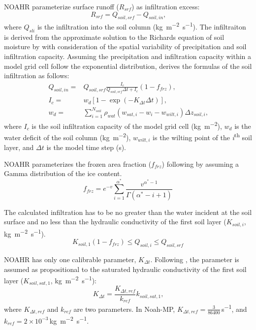 \documentclass[essd]{copernicus}
\begin{document}
NOAHR parameterize surface runoff (\(R_{srf}\)) as infiltration excess:
\begin{equation}
  R_{srf} = Q_{soil,srf} - Q_{soil,in} \text{,}
\end{equation}
where \(Q_{sli}\) is the infiltration into the soil column
(\si{kg~m^{-2}~s^{-1}}). The infiltraiton is derived from the approximate
solution to the Richards equation of soil moisture by \citet{philip1969AiH} with
consideration of the spatial variability of precipitation and soil infiltration
capacity. Assuming the precipitation and infiltration capacity within a model
grid cell follow the exponential distribution, \citet{schaake1996JGRA} derives
the formulas of the soil infiltration as follows:
\begin{align}
  Q_{soil,in} = & Q_{soil,srf} \frac{I_c}{Q_{soil,srf} \Delta t + I_c} (1-f_{frz}) \text{,} \\
  I_{c} =       & w_d [1-\exp(-K_{\Delta t} \Delta t)] \text{,} \\
  w_d =         & \sum_{i=1}^{N_{soil}} \rho_{wat} (w_{sat,i} - w_i - w_{wilt,i}) \Delta z_{soil,i}
  \text{,}
\end{align}
where \(I_{c}\) is the soil infiltration capacity of the model grid cell
(\si{kg~m^{-2}}), \(w_d\) is the water deficit of the soil column
(\si{kg~m^{-2}}), \(w_{wilt,i}\) is the wilting point of the
\textit{i}\textsuperscript{th} soil layer, and \(\Delta t\) is the model time
step (\si{s}).

NOAHR parameterizes the frozen area fraction (\(f_{frz}\)) following
\citet{koren1999JGRA} by assuming a Gamma distribution of the ice content.
\begin{equation}
  f_{frz} = e^{-v} \sum_{i=1}^{\alpha^*} \frac{v^{\alpha^*-1}}{\Gamma(\alpha^*-i+1)}
\end{equation}

The calculated infiltration has to be no greater than the water
incident at the soil surface and no less than the hydraulic conductivity of the
first soil layer (\(K_{soil,i}\), \si{kg~m^{-2}~s^{-1}}).
\begin{equation}
  K_{soil,1} (1-f_{frz}) \leq Q_{soil,i} \leq Q_{soil,srf}
\end{equation}

NOAHR has only one calibrable parameter, \(K_{\Delta t}\). Following
\citet{chen2001MWR}, the parameter is assumed as propositional to the saturated
hydraulic conductivity of the first soil layer (\(K_{soil,sat,1}\),
\si{kg~m^{-2}~s^{-1}}):
\begin{equation}
  K_{\Delta t} = \frac{{K}_{\Delta t, ref}}{k_{ref}} k_{soil,sat,1} \text{,}
\end{equation}
where \(K_{\Delta t,ref}\) and \(k_{ref}\) are two parameters. In Noah-MP,
\(K_{\Delta t,ref} = \frac{3}{86400}\)\,\si{s^{-1}}, and \(k_{ref}=2 \times
10^{-3}\)\,\si{kg~m^{-2}~s^{-1}}.
\end{document}
